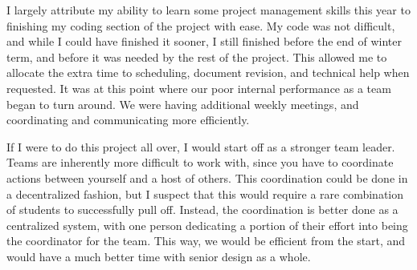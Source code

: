 I largely attribute my ability to learn some project management skills this year to finishing my coding section of the project with ease. My code was not difficult, and while I could have finished it sooner, I still finished before the end of winter term, and before it was needed by the rest of the project. This allowed me to allocate the extra time to scheduling, document revision, and technical help when requested. It was at this point where  our poor internal performance as a team began to turn around. We were having additional weekly meetings, and coordinating and communicating more efficiently.

If I were to do this project all over, I would start off as a stronger team leader. Teams are inherently more difficult to work with, since you have to coordinate actions between yourself and a host of others. This coordination could be done in a decentralized fashion, but I suspect that this would require a rare combination of students to successfully pull off. Instead, the coordination is better done as a centralized system, with one person dedicating a portion of their effort into being the coordinator for the team. This way, we would be efficient from the start, and would have a much better time with senior design as a whole.
